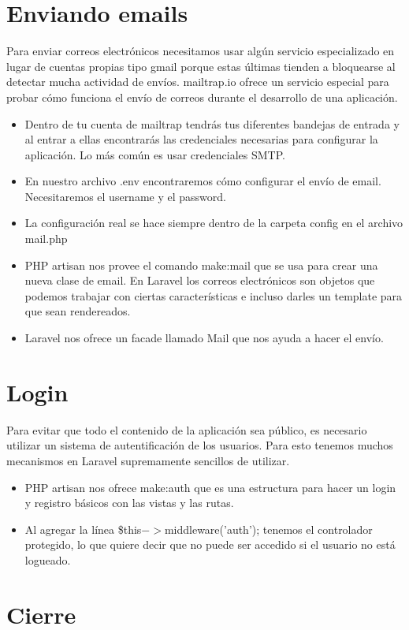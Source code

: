 \documentclass{article}
\begin{document}
\section{Enviando emails}%
Para enviar correos electrónicos necesitamos usar algún servicio especializado
en lugar de cuentas propias tipo gmail porque estas últimas tienden a
bloquearse al detectar mucha actividad de envíos. mailtrap.io ofrece un
servicio especial para probar cómo funciona el envío de correos durante el
desarrollo de una aplicación.\\

\begin{itemize}
  \item Dentro de tu cuenta de mailtrap tendrás tus diferentes bandejas de
    entrada y al entrar a ellas encontrarás las credenciales necesarias para
    configurar la aplicación. Lo más común es usar credenciales SMTP.
  \item En nuestro archivo .env encontraremos cómo configurar el envío de
    email. Necesitaremos el username y el password.
  \item La configuración real se hace siempre dentro de la carpeta config en el
    archivo mail.php
  \item PHP artisan nos provee el comando make:mail que se usa para crear una
    nueva clase de email. En Laravel los correos electrónicos son objetos que
    podemos trabajar con ciertas características e incluso darles un template
    para que sean rendereados.
  \item Laravel nos ofrece un facade llamado Mail que nos ayuda a hacer el
    envío.
\end{itemize}

\section{Login}%
Para evitar que todo el contenido de la aplicación sea público, es necesario
utilizar un sistema de autentificación de los usuarios. Para esto tenemos
muchos mecanismos en Laravel supremamente sencillos de utilizar.\\

\begin{itemize}
  \item PHP artisan nos ofrece make:auth que es una estructura para hacer un
    login y registro básicos con las vistas y las rutas.
  \item Al agregar la línea \$this$->$middleware('auth'); tenemos el controlador
    protegido, lo que quiere decir que no puede ser accedido si el usuario no
    está logueado.
\end{itemize}

\section{Cierre}%
\end{document}
